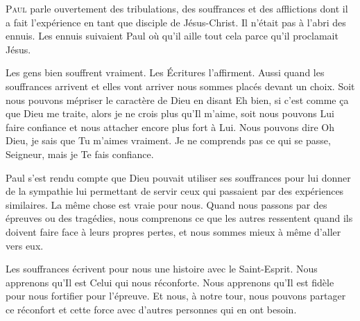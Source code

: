 


\lettrine{P}{aul} parle ouvertement des tribulations,
 des souffrances et des afflictions dont il a fait
 l'expérience en tant que disciple de Jésus-Christ.
 Il n'était pas à l'abri des ennuis.
 Les ennuis suivaient Paul où qu'il aille
 \ocadr tout cela parce qu'il proclamait Jésus.


Les \Og gens bien \Fg{} souffrent vraiment.
 Les Écritures l'affirment.
 Aussi quand les souf\-fran\-ces arrivent
 \ocadr et elles vont arriver \fcadr{}
 nous sommes placés devant un choix.
 Soit nous pouvons mépriser le caractère de Dieu
 en disant\frcolon{} 
 \Og Eh bien, si c'est comme \c{c}a que Dieu me traite,
 alors je ne crois plus qu'Il m'aime, \Fg{}
 soit nous pouvons Lui faire confiance et nous attacher
 encore plus fort à Lui.
 Nous pouvons dire\frcolon{} 
 \Og Oh Dieu, je sais que Tu m'aimes vraiment.
 Je ne comprends pas ce qui se passe, Seigneur,
 mais je Te fais confiance. \Fg{}

Paul s'est rendu compte que Dieu pouvait utiliser
 ses souffrances pour lui donner de la sympathie
 lui permettant de servir ceux qui passaient
 par des expériences similaires.
 La même chose est vraie pour nous.
 Quand nous passons par des épreuves ou des tragédies,
 nous comprenons ce que les autres ressentent
 quand ils doivent faire face à leurs propres pertes,
 et nous sommes mieux à même d'aller vers eux.

Les souffrances écrivent pour nous une histoire
 avec le Saint-Esprit.
 Nous apprenons qu'Il est Celui qui nous réconforte.
 Nous apprenons qu'Il est fidèle pour nous fortifier pour l'épreuve.
 Et nous, à notre tour, nous pouvons partager ce réconfort
 et cette force avec d'autres personnes qui en ont besoin.

\dvrule




